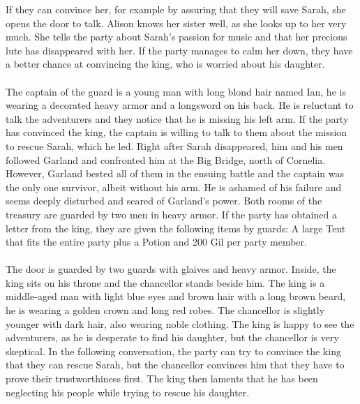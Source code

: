 If they can convince her, for example by assuring that they will save Sarah, she opens the door to talk.
Alison knows her sister well, as she looks up to her very much.
She tells the party about Sarah's passion for music and that her precious lute has disappeared with her.
If the party manages to calm her down, they have a better chance at convincing the king, who is worried about his daughter.
%
\ofpar
%
\\\\
%
 The captain of the guard is a young man with long blond hair named Ian, he is wearing a decorated heavy armor and a longsword on his back.
He is reluctant to talk the adventurers and they notice that he is missing his left arm. 
If the party has convinced the king, the captain is willing to talk to them about the mission to rescue Sarah, which he led.
Right after Sarah disappeared, him and his men followed Garland and confronted him at the Big Bridge, north of Cornelia.
However, Garland bested all of them in the ensuing battle and the captain was the only one survivor, albeit without his arm.
He is ashamed of his failure and seems deeply disturbed and scared of Garland's power.
%
\ofpar
%
Both rooms of the treasury are guarded by two men in heavy armor.
If the party has obtained a letter from the king, they are given the following items by guards: 
A large Tent that fits the entire party plus a Potion and 200 Gil per party member.
%
\ofpar
%
\\\\
%
 The door is guarded by two guards with glaives and heavy armor.
Inside, the king sits on his throne and the chancellor stands beside him.
The king is a middle-aged man with light blue eyes and brown hair with a long brown beard, he is wearing a golden crown and long red robes.
The chancellor is slightly younger with dark hair, also wearing noble clothing.
The king is happy to see the adventurers, as he is desperate to find his daughter, but the chancellor is very skeptical.
In the following conversation, the party can try to convince the king that they can rescue Sarah, but the chancellor convinces him that they have to prove their trustworthiness first.
The king then laments that he has been neglecting his people while trying to rescue his daughter.
